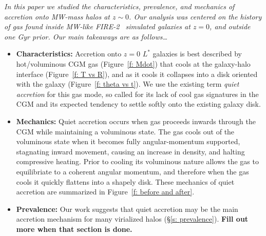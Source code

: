 \documentclass[fleqn,usenatbib]{mnras}
\begin{document}
\textit{
In this paper we studied the characteristics, prevalence, and mechanics of accretion onto MW-mass halos at $z \sim 0$.
Our analysis was centered on the history of gas found inside MW-like FIRE-2~\citep{Hopkins2018} simulated galaxies at $z=0$, and outside one Gyr prior.
Our main takeaways are as follows\ldots
}
\begin{itemize}
    \item \textbf{Characteristics:}
    Accretion onto $z=0$ $L^*$ galaxies is best described by hot/voluminous CGM gas (Figure~\ref{f: Mdot}) that cools at the galaxy-halo interface (Figure~\ref{f: T vs R}), and as it cools it collapses into a disk oriented with the galaxy (Figure~\ref{f: theta vs t}).
    We use the existing term \textit{quiet accretion} for this gas mode, so called for its lack of cool gas signatures in the CGM and its expected tendency to settle softly onto the existing galaxy disk.
    \item \textbf{Mechanics:}
    Quiet accretion occurs when gas proceeds inwards through the CGM while maintaining a voluminous state.
    The gas cools out of the voluminous state when it becomes fully angular-momentum supported, stagnating inward movement, causing an increase in density, and halting compressive heating.
    Prior to cooling its voluminous nature allows the gas to equilibriate to a coherent angular momentum, and therefore when the gas cools it quickly flattens into a shapely disk.
    These mechanics of quiet accretion are summarized in Figure~\ref{f: before and after}.
    \item \textbf{Prevalence:} Our work suggests that quiet accretion may be the main accretion mechanism for many virialized halos (\S\ref{s: prevalence}).
    \textbf{Fill out more when that section is done.}
\end{itemize}
\end{document}
